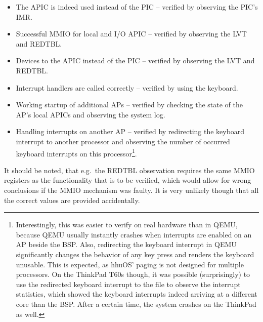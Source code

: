\begin{itemize}
  \item The APIC is indeed used instead of the PIC -- verified by observing the PIC's IMR\@.
  \item Successful MMIO for local and I/O APIC -- verified by observing the LVT and REDTBL\@.
  \item Devices  to the APIC instead of the PIC -- verified by observing the LVT and REDTBL\@.
  \item Interrupt handlers are called correctly -- verified by using the keyboard.
  \item Working startup of additional APs -- verified by checking the state of the AP's local APICs and observing the system log.
  \item Handling interrupts on another AP -- verified by redirecting the keyboard interrupt to another processor and observing the number of occurred keyboard interrupts on this processor\footnote{
          Interestingly, this was easier to verify on real hardware than in QEMU, because QEMU usually instantly crashes when interrupts are enabled on an AP beside the BSP\@.
          Also, redirecting the keyboard interrupt in QEMU significantly changes the behavior of any key press and renders the keyboard unusable.
          This is expected, as hhuOS' paging is not designed for multiple processors.
          On the ThinkPad T60s though, it was possible (surprisingly) to use the redirected keyboard interrupt to  the  file to observe the interrupt statistics, which showed the keyboard interrupts indeed arriving at a different core than the BSP\@.
          After a certain time, the system crashes on the ThinkPad as well.}.
\end{itemize}

It should be noted, that e.g.\ the REDTBL observation requires the same MMIO registers as the functionality that is to be verified, which would allow for wrong conclusions if the MMIO mechanism was faulty.
It is very unlikely though that all the correct values are provided accidentally.

\cleardoublepage